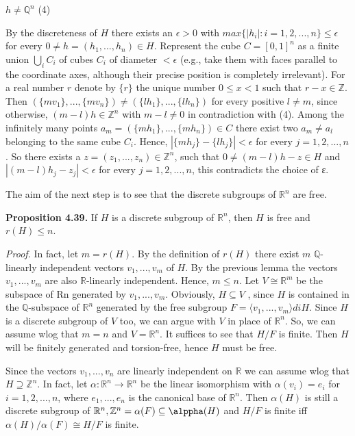 \documentclass[12pt]{article}
\begin{document}
    $h \neq \mathbb{Q}^n$ (4)


By the discreteness of $H$ there exists an $\epsilon > 0$ with $max\{|h_i| : i = 1, 2, . . . , n\} \leq \epsilon$ for every
$0 \neq h = (h_1, . . . , h_n) \in H$. Represent the cube $C = [0, 1]^n$ as a finite union $\bigcup_i C_i$ of cubes $C_i$ of diameter $< \epsilon$ (e.g., take
them with faces parallel to the coordinate axes, although their precise position is completely irrelevant). For a
real number $r$ denote by $\{r\}$ the unique number $0 \leq x < 1$ such that $r - x \in \mathbb{Z}$. Then $(\{mv_1\}, . . . , \{mv_n\}) \neq (\{lh_1\}, . . . , \{lh_n\})$
for every positive $l \neq m$, since otherwise, $(m - l)h \in \mathbb{Z}^n$ with $m - l \neq 0$ in contradiction with
(4). Among the infinitely many points $a_m = (\{mh_1\}, . . . , \{mh_n\}) \in C$ there exist two $a_m \neq a_l$ belonging to the
same cube $C_i$. Hence, $|\{mh_j\} - \{lh_j\}| < \epsilon$ for every $j = 1, 2, . . . , n$. So there exists a $z = (z_1, . . . , z_n) \in \mathbb{Z}^n$,
such that $0 \neq (m - l)h - z \in H$ and $|(m - l)h_j - z_j | < \epsilon$ for every $j = 1, 2, . . . , n$, this contradicts the choice of
ε.


The aim of the next step is to see that the discrete subgroups of $\mathbb{R}^n$ are free.

\textbf{Proposition 4.39.} If $H$ is a discrete subgroup of $\mathbb{R}^n$, then $H$ is free and $r(H) \leq n$.


\emph{Proof.} In fact, let $m = r(H)$. By the definition of $r(H)$ there exist $m$ $\mathbb{Q}$-linearly independent vectors $v_1, . . . , v_m$
of $H$. By the previous lemma the vectors $v_1, . . . , v_m$ are also $\mathbb{R}$-linearly independent. Hence, $m \leq n$. Let
$V \cong \mathbb{R}^m$ be the subspace of Rn generated by $v_1, . . . , v_m$. Obviously, $H \subseteq V$ , since $H$ is contained in the
$\mathbb{Q}$-subspace of $\mathbb{R}^n$ generated by the free subgroup $F = \langle v_1, . . . , v_m \rangle di H$. Since $H$ is a discrete subgroup of $V$
too, we can argue with $V$ in place of $\mathbb{R}^n$. So, we can assume wlog that $m = n$ and $V = \mathbb{R}^n$. It suffices to see
that $H/F$ is finite. Then $H$ will be finitely generated and torsion-free, hence $H$ must be free.


    Since the vectors $v_1, . . . , v_n$ are linearly independent on $\mathbb{R}$ we can assume wlog that $H \supseteq \mathbb{Z}^n$. In fact, let
$\alpha : \mathbb{R}^n \to \mathbb{R}^n$ be the linear isomorphism with $\alpha(v_i) = e_i$ for $i = 1, 2, . . . , n$, where $e_1, . . . , e_n$ is the canonical base
of $\mathbb{R}^n$. Then $\alpha(H)$ is still a discrete subgroup of $\mathbb{R}^n, \mathbb{Z}^n = \alpha(F) \subseteq \alppha(H)$ and $H/F$ is finite iff $\alpha(H)/\alpha(F) \cong H/F$
is finite.
\end{document}
